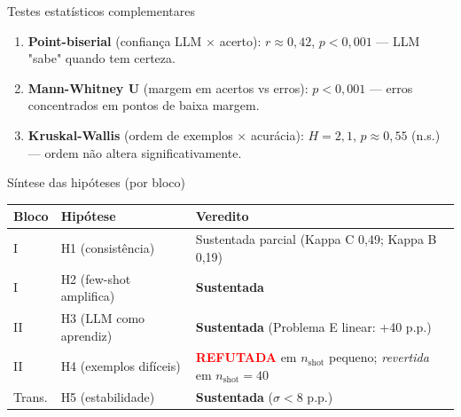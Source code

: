 \documentclass[aspectratio=169,10pt]{beamer}
\begin{document}
\begin{frame}{Testes estat\'isticos complementares}
  \footnotesize
  \begin{enumerate}
    \item \textbf{Point-biserial} (confian\c{c}a LLM $\times$ acerto): $r \approx 0{,}42$, $p<0{,}001$ --- LLM "sabe" quando tem certeza.
    \item \textbf{Mann-Whitney U} (margem em acertos vs erros): $p<0{,}001$ --- erros concentrados em pontos de baixa margem.
    \item \textbf{Kruskal-Wallis} (ordem de exemplos $\times$ acur\'acia): $H = 2{,}1$, $p \approx 0{,}55$ (n.s.) --- ordem n\~ao altera significativamente.
  \end{enumerate}
\end{frame}

\begin{frame}{S\'intese das hip\'oteses (por bloco)}
  \footnotesize
  \begin{center}
  \begin{tabular}{llp{5cm}}
    \toprule
    Bloco & Hip\'otese & Veredito \\
    \midrule
    I  & H1 (consist\^encia)            & Sustentada parcial (Kappa C 0,49; Kappa B 0,19) \\
    I  & H2 (few-shot amplifica)        & \textbf{Sustentada} \\
    II & H3 (LLM como aprendiz)         & \textbf{Sustentada} (Problema E linear: +40 p.p.) \\
    II & H4 (exemplos dif\'iceis)        & \textcolor{red}{\textbf{REFUTADA}} em $n_{\text{shot}}$ pequeno; \emph{revertida} em $n_{\text{shot}}=40$ \\
    Trans. & H5 (estabilidade)         & \textbf{Sustentada} ($\sigma < 8$ p.p.) \\
    \bottomrule
  \end{tabular}
  \end{center}
\end{frame}
\end{document}
